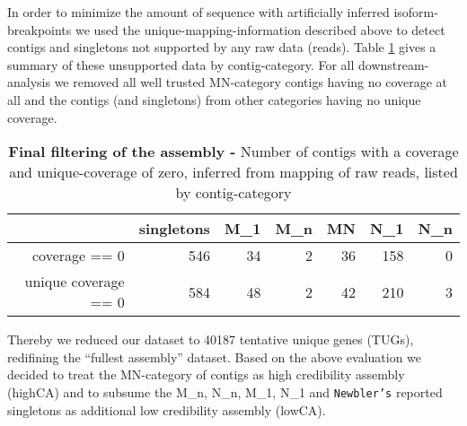 In order to minimize the amount of sequence with artificially inferred
isoform-breakpoints we used the unique-mapping-information described
above to detect contigs and singletons not supported by any raw data
(reads). Table \ref{tab:cov.ex} gives a summary of these unsupported
data by contig-category. For all downstream-analysis we removed all
well trusted MN-category contigs having no coverage at all and the
contigs (and singletons) from other categories having no unique
coverage.

\begin{table}[ht]
\begin{center}
\begin{tabular}{rrrrrrr}
  \hline
 & singletons & M\_1 & M\_n & MN & N\_1 & N\_n \\ 
  \hline
coverage == 0 & 546 &  34 &   2 &  36 & 158 &   0 \\ 
  unique coverage == 0 & 584 &  48 &   2 &  42 & 210 &   3 \\ 
   \hline
\end{tabular}
\caption[finalizing the assembly]{\textbf{Final filtering of the
    assembly -} Number of contigs with a coverage and unique-coverage
  of zero, inferred from mapping of raw reads, listed by
  contig-category}
\label{tab:cov.ex}
\end{center}
\end{table}

Thereby we reduced our dataset to 40187 tentative unique genes (TUGs),
redifining the ``fullest assembly'' dataset. Based on the above
evaluation we decided to treat the MN-category of contigs as high
credibility assembly (highCA) and to subsume the M\_n, N\_n, M\_1,
N\_1 and \texttt{Newbler's} reported singletons as additional low
credibility assembly (lowCA).

